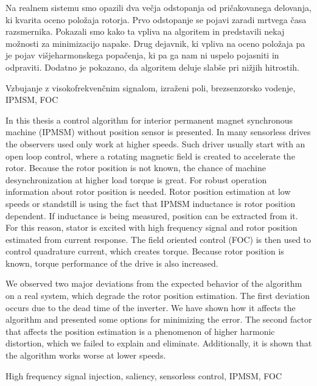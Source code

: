 \documentclass[a4paper,twoside,openright,12pt,slovene]{book}
\begin{document}
Na realnem sistemu smo opazili dva večja odstopanja od pričakovanega delovanja, ki kvarita oceno položaja rotorja. Prvo odstopanje se pojavi zaradi mrtvega časa razsmernika. Pokazali smo kako ta vpliva na 
algoritem in predstavili nekaj možnosti za minimizacijo napake. Drug dejavnik, ki vpliva na oceno položaja pa je pojav višjeharmonskega popačenja, ki pa ga nam ni uspelo pojasniti in odpraviti. 
Dodatno je pokazano, da algoritem deluje slabše pri nižjih hitrostih.

\kljucnebesede
Vzbujanje z visokofrekvenčnim signalom, izraženi poli, brezsenzorsko vodenje, IPMSM, FOC



\abstract

In this thesis a control algorithm for interior permanent magnet synchronous machine (IPMSM) without position sensor is presented. In many sensorless drives the observers used only work at higher speeds. 
Such driver usually start with an open loop control, where a rotating magnetic field is created to accelerate the rotor. Because the rotor position is not known, the chance of machine desynchronization 
at higher load torque is great. For robust operation information about rotor position is needed.
Rotor position estimation at low speeds or standstill is using the fact that IPMSM inductance is rotor position dependent. If inductance is being measured, position can be extracted from it. 
For this reason, stator is excited with high frequency signal and rotor position estimated from current response. The field oriented control (FOC) is then used to control quadrature current, 
which creates torque. Because rotor position is known, torque performance of the drive is also increased.

We observed two major deviations from the expected behavior of the algorithm on a real system, which degrade the rotor position estimation. The first deviation occurs due to the dead time of the inverter.
We have shown how it affects the algorithm and presented some options for minimizing the error. The second factor that affects the position estimation is a phenomenon of higher harmonic distortion, which we 
failed to explain and eliminate. Additionally, it is shown that the algorithm works worse at lower speeds.

\keywords
High frequency signal injection, saliency, sensorless control, IPMSM, FOC
\end{document}
